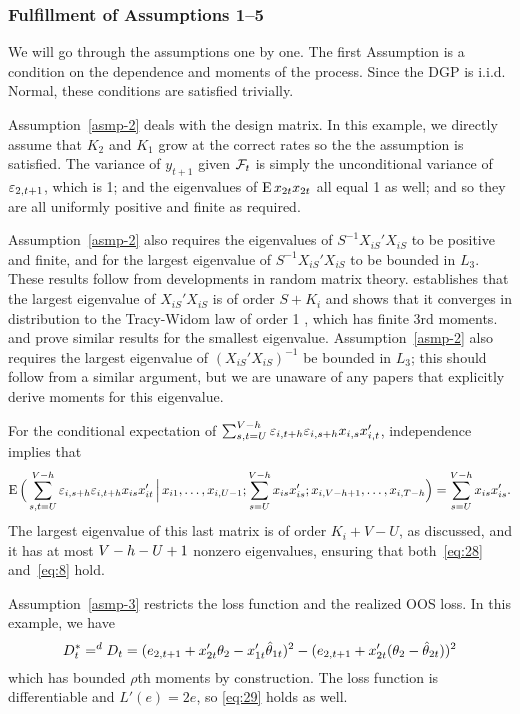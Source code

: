 \documentclass[12pt]{article}
\begin{document}
\subsubsection*{Fulfillment of Assumptions 1--5}

We will go through the assumptions one by one. The first Assumption is
a condition on the dependence and moments of the process. Since the
DGP is i.i.d. Normal, these conditions are satisfied trivially.

Assumption~\ref{asmp-2} deals with the design matrix. In this example,
we directly assume that $K_2$ and $K_1$ grow at the correct rates so
the the assumption is satisfied. The variance of $y_{t+1}$ given
$\mathcal{F}_t$ is simply the unconditional variance of $\varepsilon_{2,t+1}$, which is
1; and the eigenvalues of $\operatorname{E} x_{2t} x_{2t}$ all equal 1 as well; and
so they are all uniformly positive and finite as required.

Assumption~\ref{asmp-2} also requires the eigenvalues of $S^{-1}
X_{iS}'X_{iS}$ to be positive and finite, and for the largest
eigenvalue of $S^{-1} X_{iS}'X_{iS}$ to be bounded in $L_3$.  These
results follow from developments in random matrix theory.
\citet{Gem:80} establishes that the largest eigenvalue of
$X_{iS}'X_{iS}$ is of order $S + K_i$ and \citet{Joh:01} shows that it
converges in distribution to the Tracy-Widom law of order 1
\citep{TrW:96}, which has finite 3rd moments. \citet{Sil:85} and
\citet{BFP:98} prove similar results for the smallest eigenvalue.
Assumption~\ref{asmp-2} also requires the largest eigenvalue of
$(X_{iS}'X_{iS})^{-1}$ be bounded in $L_3$; this should follow from a
similar argument, but we are unaware of any papers that explicitly
derive moments for this eigenvalue.

For the conditional expectation of %
$\sum_{s,t=U}^{V-h} \varepsilon_{i,t+h} \varepsilon_{i,s+h} x_{i,s} x_{i,t}'$,
independence implies that
\begin{equation*}
  \operatorname{E}\Big(
  \sum_{s,t=U}^{V-h} \varepsilon_{i,s+h} \varepsilon_{i,t+h} x_{is}x_{it}'
  \,\Big|\,
  x_{i1},\dots,x_{i,U-1};
  \sum_{s=U}^{V-h} x_{is} x_{is}';
  x_{i,V-h+1},\dots,x_{i,T-h}
  \Big)
  = \sum_{s=U}^{V-h} x_{is} x_{is}'.
\end{equation*}
The largest eigenvalue of this last matrix is of order $K_i + V - U$,
as discussed, and it has at most $V-h - U + 1$ nonzero eigenvalues,
ensuring that both~\eqref{eq:28} and~\eqref{eq:8} hold.

Assumption~\ref{asmp-3} restricts the loss function and the realized
OOS loss. In this example, we have
\begin{equation*}
  D_t^* =^d D_t = (e_{2,t+1} + x_{2t}'\theta_2 - x_{1t}'\hat\theta_{1t})^2
  - (e_{2,t+1} + x_{2t}'(\theta_2 - \hat\theta_{2t}))^2
\end{equation*}
which has bounded $\rho$th moments by construction. The loss function
is differentiable and $L'(e) = 2 e$, so \eqref{eq:29} holds as well.
\end{document}
